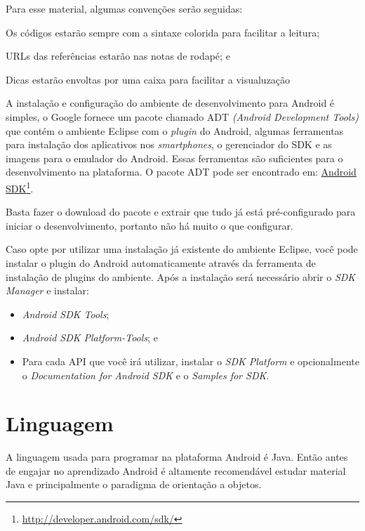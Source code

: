 \documentclass[a4paper,12pt,brazil,doubleside]{book}
\begin{document}
 Para esse material, algumas convenções serão seguidas: 
 \bi
 \item
Os códigos estarão sempre com a sintaxe colorida para facilitar a leitura;
\item
URLs das referências estarão nas notas de rodapé; e
\item
 Dicas estarão envoltas por uma caixa para facilitar a visualuzação
\ei


A instalação e configuração do ambiente de desenvolvimento para Android é simples, o Google fornece um pacote chamado ADT \emph{(Android Development Tools)} que contém o ambiente Eclipse com o \emph{plugin} do Android, algumas ferramentas para instalação dos aplicativos nos \emph{smartphones}, o gerenciador do SDK e as imagens para o emulador do Android. Essas ferramentas são suficientes para o desenvolvimento na plataforma.
O pacote ADT pode ser encontrado em: \href{http://developer.android.com/sdk/}{Android SDK}\footnote{\href{http://developer.android.com/sdk/}{http://developer.android.com/sdk/}}. 

Basta fazer o download do pacote e extrair que tudo já está pré-configurado para iniciar o desenvolvimento, portanto não há muito o que configurar.

Caso opte por utilizar uma instalação já existente do ambiente Eclipse, você pode instalar o plugin do Android automaticamente através da ferramenta de instalação de plugins do ambiente. Após a instalação será necessário abrir o \emph{SDK Manager} e instalar:
\begin{itemize}[noitemsep, nolistsep]
\item \emph{Android SDK Tools};
\item \emph{Android SDK Platform-Tools}; e
\item Para cada API que você irá utilizar, instalar o \emph{SDK Platform} e opcionalmente o \emph{Documentation for Android SDK} e o \emph{Samples for SDK}.
\end{itemize}

\section{Linguagem}
A linguagem usada para programar na plataforma Android é Java. Então antes de engajar no aprendizado Android é altamente recomendável estudar material Java e principalmente o paradigma de orientação a objetos.
\end{document}

